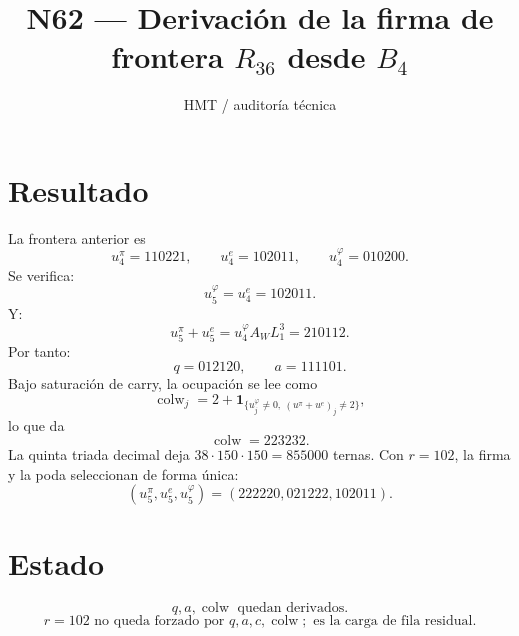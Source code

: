 \documentclass[11pt,a4paper]{article}
\title{\bfseries N62 --- Derivación de la firma de frontera \(R_{36}\) desde \(B_4\)}
\author{HMT / auditoría técnica}
\date{}
\begin{document}
\maketitle
\section*{Resultado}
La frontera anterior es
\[
u_4^\pi=110221,\qquad u_4^e=102011,\qquad u_4^\varphi=010200.
\]
Se verifica:
\[
\boxed{u_5^\varphi=u_4^e=102011.}
\]
Y:
\[
\boxed{u_5^\pi+u_5^e=u_4^\varphi A_WL_1^3=210112.}
\]
Por tanto:
\[
\boxed{q=012120,\qquad a=111101.}
\]
Bajo saturación de carry, la ocupación se lee como
\[
\operatorname{colw}_j=2+\mathbf1_{\{u^\varphi_j\ne0,\ (u^\pi+u^e)_j\ne2\}},
\]
lo que da
\[
\boxed{\operatorname{colw}=223232.}
\]
La quinta triada decimal deja \(38\cdot150\cdot150=855000\) ternas. Con \(r=102\), la firma y la poda seleccionan de forma única:
\[
\boxed{(u_5^\pi,u_5^e,u_5^\varphi)=(222220,021222,102011).}
\]
\section*{Estado}
\[
\boxed{q,a,\operatorname{colw}\text{ quedan derivados.}}
\]
\[
\boxed{r=102\text{ no queda forzado por }q,a,c,\operatorname{colw};\text{ es la carga de fila residual.}}
\]
\end{document}
